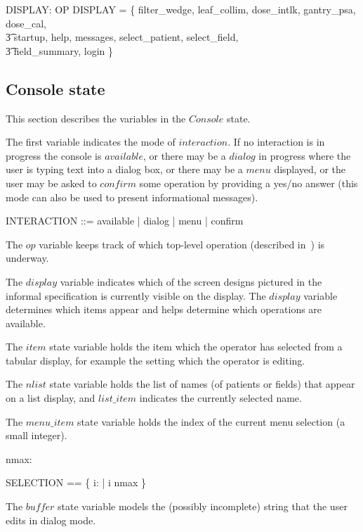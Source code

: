 \documentclass{article}
\begin{document}
\begin{axdef}
	DISPLAY: \power OP
\where
DISPLAY = \{ filter\_wedge, leaf\_collim, dose\_intlk, gantry\_psa, dose\_cal, \\
\t3	startup, help, messages, select\_patient, select\_field, \\
\t3	field\_summary, login \}
\end{axdef}

\subsection{Console state}

This section describes the variables in the $Console$ state.  

The first variable indicates the mode of $interaction$.  If no
interaction is in progress the console is $available$, or there
may be a $dialog$ in progress where the user is typing text into a
dialog box, or there may be a $menu$ displayed, or the user may be
asked to $confirm$ some operation by providing a yes/no answer (this
mode can also be used to present informational messages).

\begin{zed}
	INTERACTION ::= available | dialog | menu | confirm
\end{zed}
The $op$ variable keeps track of which top-level operation
(described in~\cite{jacky92}) is underway.

The $display$ variable indicates which of the screen designs pictured
in the informal specification is currently visible on the display.
The $display$ variable determines which items appear and helps
determine which operations are available.  

The $item$ state variable holds the item which the operator has
selected from a tabular display, for example the setting which
the operator is editing.

The $nlist$ state variable holds the list of names (of patients or
fields) that appear on a list display, and $list\_item$ indicates 
the currently selected name.

The $menu\_item$ state variable holds the index of the current menu
selection (a small integer).

\begin{axdef}
	nmax: \nat
\end{axdef}
\begin{zed} SELECTION == \{ i: \nat | i \leq nmax \} \end{zed}
The $buffer$ state variable models the (possibly incomplete) string
that the user edits in dialog mode.
\end{document}
